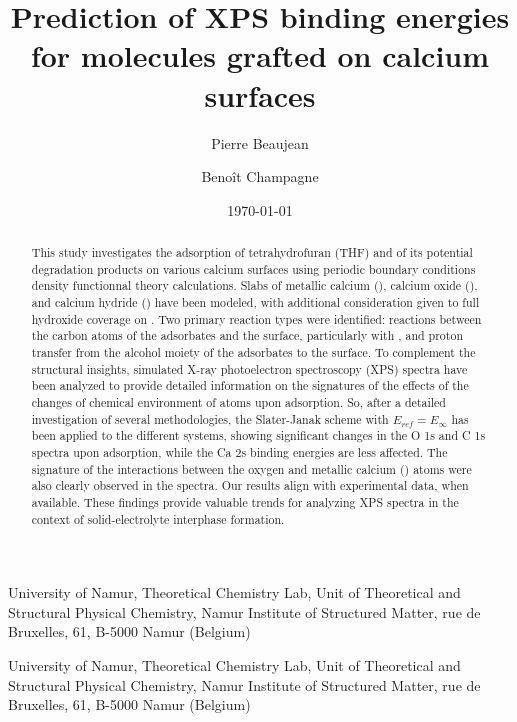 \documentclass[%
aip,
amsmath,amssymb,
preprint,%
jcp,
showkeys,
]{revtex4-2}
\begin{document}
	
\title{Prediction of XPS binding energies for molecules grafted on calcium surfaces}

\author{Pierre Beaujean}
\affiliation
{University of Namur, Theoretical Chemistry Lab, Unit of Theoretical and Structural Physical Chemistry, Namur Institute of Structured Matter, rue de Bruxelles, 61, B-5000 Namur (Belgium)}


\author{Benoît Champagne}
\affiliation
{University of Namur, Theoretical Chemistry Lab, Unit of Theoretical and Structural Physical Chemistry, Namur Institute of Structured Matter, rue de Bruxelles, 61, B-5000 Namur (Belgium)}

\date{\today}

\begin{abstract} %
	This study investigates the adsorption of tetrahydrofuran (THF) and of its potential degradation products on various calcium surfaces using periodic boundary conditions density functionnal theory calculations. Slabs of metallic calcium (), calcium oxide (), and calcium hydride () have been modeled, with additional consideration given to full hydroxide coverage on . Two primary reaction types were identified: reactions between the carbon atoms of the adsorbates and the surface, particularly with , and proton transfer from the alcohol moiety of the adsorbates to the  surface. To complement the structural insights, simulated X-ray photoelectron spectroscopy (XPS) spectra have been analyzed to provide detailed information on the signatures of the effects of the changes of chemical environment of atoms upon adsorption. 
	So, after a detailed investigation of several methodologies, the Slater-Janak scheme with $E_{ref}=E_\infty$ has been applied to the different systems, showing significant changes in the O 1s and C 1s spectra upon adsorption, while the Ca 2s binding energies are less affected. The signature of the interactions between the oxygen and metallic calcium () atoms were also clearly observed in the spectra. Our results align with experimental data, when available.	These findings provide valuable trends for analyzing XPS spectra in the context of solid-electrolyte interphase formation. 
\end{abstract}


\maketitle
\end{document}
